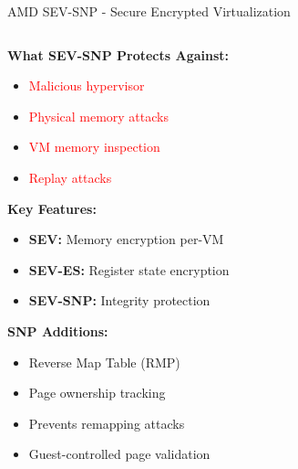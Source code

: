 \documentclass[aspectratio=169,12pt]{beamer}
\begin{document}
\begin{frame}{AMD SEV-SNP - Secure Encrypted Virtualization}
    \begin{columns}
        \begin{column}{0.5\textwidth}
            \textbf{What SEV-SNP Protects Against:}
            \begin{itemize}
                \item \textcolor{red}{Malicious hypervisor}
                \item \textcolor{red}{Physical memory attacks}
                \item \textcolor{red}{VM memory inspection}
                \item \textcolor{red}{Replay attacks}
            \end{itemize}
            
            \vspace{0.3cm}
            \textbf{Key Features:}
            \begin{itemize}
                \item \textbf{SEV:} Memory encryption per-VM
                \item \textbf{SEV-ES:} Register state encryption
                \item \textbf{SEV-SNP:} Integrity protection
            \end{itemize}
            
            \vspace{0.3cm}
            \textbf{SNP Additions:}
            \begin{itemize}
                \item Reverse Map Table (RMP)
                \item Page ownership tracking
                \item Prevents remapping attacks
                \item Guest-controlled page validation
            \end{itemize}
        \end{column}
        \begin{column}{0.5\textwidth}
\end{column}
\end{columns}
\end{frame}
\end{document}
